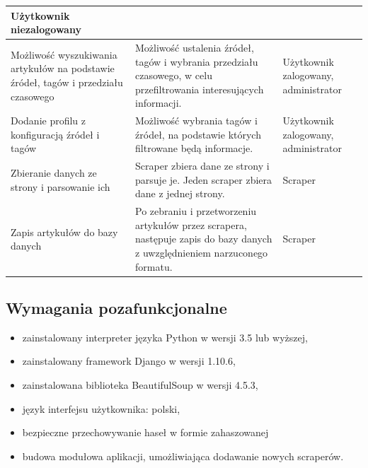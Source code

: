 \documentclass[12pt, titlepage]{article}
\begin{document}
\begin{longtable}{ | C{5cm} | C{8cm} | C{4.5cm} |}
		Użytkownik niezalogowany \\
		\hline
		Możliwość wyszukiwania artykułów na podstawie źródeł, tagów i przedziału czasowego &
		Możliwość ustalenia źródeł, tagów i wybrania przedziału czasowego, w celu przefiltrowania interesujących informacji. &
		Użytkownik zalogowany, administrator \\
		\hline
		Dodanie profilu z konfiguracją źródeł i tagów &
		Możliwość wybrania tagów i źródeł, na podstawie których filtrowane będą informacje. &
		Użytkownik zalogowany, administrator \\
		\hline
		Zbieranie danych ze strony i parsowanie ich &
		Scraper zbiera dane ze strony i parsuje je. Jeden scraper zbiera dane z jednej strony. &
		Scraper \\
		\hline
		Zapis artykułów do bazy danych &
		Po zebraniu i przetworzeniu artykułów przez scrapera, następuje zapis do bazy danych z uwzględnieniem narzuconego formatu. &
		Scraper \\
		\hline
	\end{longtable}

	\subsection{Wymagania pozafunkcjonalne}
		\begin{itemize}
		\item zainstalowany interpreter języka Python w wersji 3.5 lub wyższej,
		\item zainstalowany framework Django w wersji 1.10.6,
		\item zainstalowana biblioteka BeautifulSoup w wersji 4.5.3,
		\item język interfejsu użytkownika: polski,
		\item bezpieczne przechowywanie haseł w formie zahaszowanej
		\item budowa modułowa aplikacji, umożliwiająca dodawanie nowych scraperów.
		\newline
		\end{itemize}
	\newpage
\end{document}
